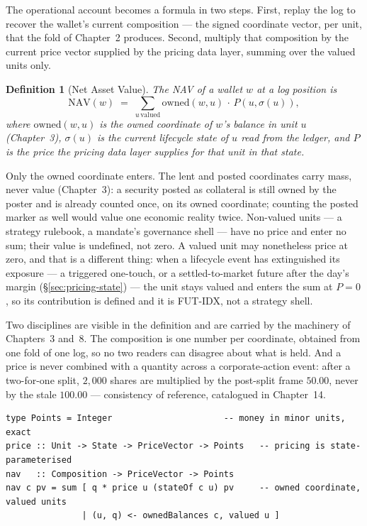 \documentclass[11pt,a4paper]{article}
\newtheorem{definition}{Definition}[section]
\begin{document}
The operational account becomes a formula in two steps. First, replay the log
to recover the wallet's current composition --- the signed coordinate vector,
per unit, that the fold of Chapter~2 produces. Second, multiply that
composition by the current price vector supplied by the pricing data layer,
summing over the valued units only.

\begin{definition}[Net Asset Value]
The NAV of a wallet $w$ at a log position is
\[
  \mathrm{NAV}(w) \;=\; \sum_{u \,\text{valued}} \mathrm{owned}(w,u)\,\cdot\, P\!\left(u, \sigma(u)\right),
\]
where $\mathrm{owned}(w,u)$ is the owned coordinate of $w$'s balance in unit
$u$ (Chapter~3), $\sigma(u)$ is the current lifecycle state of $u$ read from
the ledger, and $P$ is the price the pricing data layer supplies for that unit
in that state.
\end{definition}

Only the owned coordinate enters. The lent and posted coordinates carry mass,
never value (Chapter~3): a security posted as collateral is still owned by the
poster and is already counted once, on its owned coordinate; counting the
posted marker as well would value one economic reality twice. Non-valued units
--- a strategy rulebook, a mandate's governance shell --- have no price and
enter no sum; their value is undefined, not zero. A valued unit may nonetheless
price at zero, and that is a different thing: when a lifecycle event has
extinguished its exposure --- a triggered one-touch, or a settled-to-market
future after the day's margin (\S\ref{sec:pricing-state}) --- the unit stays
valued and enters the sum at $P=0$, so its contribution is defined and it is
FUT-IDX, not a strategy shell.

Two disciplines are visible in the definition and are carried by the machinery
of Chapters~3 and~8. The composition is one number per coordinate, obtained
from one fold of one log, so no two readers can disagree about what is held.
And a price is never combined with a quantity across a corporate-action event:
after a two-for-one split, $2{,}000$ shares are multiplied by the post-split
frame $50.00$, never by the stale $100.00$ --- consistency of reference,
catalogued in Chapter~14.

\begin{lstlisting}
type Points = Integer                      -- money in minor units, exact
price :: Unit -> State -> PriceVector -> Points   -- pricing is state-parameterised
nav   :: Composition -> PriceVector -> Points
nav c pv = sum [ q * price u (stateOf c u) pv     -- owned coordinate, valued units
               | (u, q) <- ownedBalances c, valued u ]
\end{lstlisting}
\end{document}
